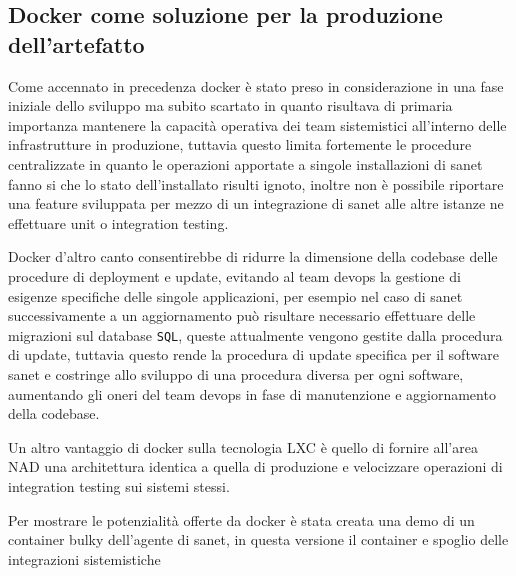 \subsection{Docker come soluzione per la produzione dell'artefatto}
Come accennato in precedenza docker\cite{docker} è stato preso in considerazione in una fase iniziale dello sviluppo ma subito scartato in quanto risultava di primaria importanza mantenere la capacità operativa dei team sistemistici all'interno delle infrastrutture in produzione, tuttavia questo limita fortemente le procedure centralizzate in quanto le operazioni apportate a singole installazioni di sanet fanno si che lo stato dell'installato risulti ignoto, inoltre non è possibile riportare una feature sviluppata per mezzo di un integrazione di sanet alle altre istanze ne effettuare unit o integration testing.

Docker d'altro canto consentirebbe di ridurre la dimensione della codebase delle procedure di deployment e update, evitando al team devops la gestione di esigenze specifiche delle singole applicazioni, per esempio nel caso di sanet successivamente a un aggiornamento può risultare necessario effettuare delle migrazioni sul database \verb|SQL|, queste attualmente vengono gestite dalla procedura di update, tuttavia questo rende la procedura di update specifica per il software sanet e costringe allo sviluppo di una procedura diversa per ogni software, aumentando gli oneri del team devops in fase di manutenzione e aggiornamento della codebase.

Un altro vantaggio di docker\cite{docker} sulla tecnologia LXC\cite{lxc} è quello di fornire all'area NAD una architettura identica a quella di produzione e velocizzare operazioni di integration testing sui sistemi stessi.

Per mostrare le potenzialità offerte da docker è stata creata una demo di un container bulky dell'agente di sanet, in questa versione il container e spoglio delle integrazioni sistemistiche


